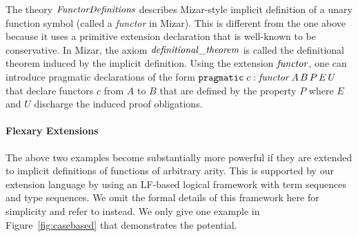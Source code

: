 The theory $\mathit{FunctorDefinitions}$ describes Mizar-style implicit definition of a unary function symbol (called a \emph{functor} in Mizar). This is different from the one above because it uses a primitive extension declaration that is well-known to be conservative. In Mizar, the axiom $\mathit{definitional\_theorem}$ is called the definitional theorem induced by the implicit definition. Using the extension $\mathit{functor}$, one can introduce pragmatic declarations of the form $\mathtt{pragmatic}\;c:\mathit{functor}\,A\,B\,P\,E\,U$ that declare functors $c$ from $A$ to $B$ that are defined by the property $P$ where $E$ and $U$ discharge the induced proof obligations.

\paragraph{Flexary Extensions}
The above two examples become substantially more powerful if they are extended to implicit definitions of functions of arbitrary arity.
This is supported by our extension language by using an LF-based logical framework with term sequences and type sequences.
We omit the formal details of this framework here for simplicity and refer to \cite{Hor:patterns} instead.
We only give one example in Figure~\ref{fig:casebased} that demonstrates the potential.

